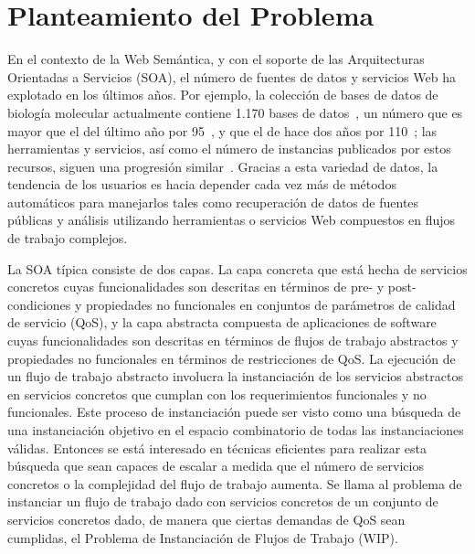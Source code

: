 \section{Planteamiento del Problema}

En el contexto de la Web Semántica, y con el soporte de las Arquitecturas Orientadas a
Servicios (SOA), el número de fuentes de datos y servicios Web ha explotado en
los últimos años. Por ejemplo, la colección de bases de datos de biología
molecular actualmente contiene 1.170 bases de datos~\cite{Galperin09}, un número
que es
mayor que el del último año por 95~\cite{Galperin2008}, y que el de hace dos
años por 110~\cite{Galperin2007};
las herramientas y servicios, así como el número de instancias
publicados por estos recursos, siguen una progresión similar~\cite{Benson07}.
Gracias a
esta variedad de datos, la tendencia de los usuarios es hacia depender cada vez
más de métodos automáticos para manejarlos tales como recuperación de datos de
fuentes públicas y análisis utilizando herramientas o servicios Web compuestos
en flujos de trabajo complejos.

La SOA típica consiste de dos capas. La capa concreta que está hecha de
servicios concretos cuyas funcionalidades son descritas en términos de pre- y
post-condiciones y propiedades no funcionales en conjuntos de parámetros de
calidad de servicio (QoS), y
la capa abstracta compuesta de aplicaciones de software cuyas funcionalidades
son descritas en términos de flujos de trabajo abstractos y propiedades no
funcionales en términos de restricciones de QoS. La ejecución de un flujo de
trabajo abstracto involucra la instanciación de los servicios abstractos en
servicios concretos que cumplan con los requerimientos funcionales y no
funcionales. Este proceso de instanciación puede ser visto como una búsqueda de
una instanciación objetivo en el espacio combinatorio de todas las
instanciaciones válidas. Entonces se está interesado en técnicas eficientes para
realizar esta búsqueda que sean capaces de escalar a medida que el número de
servicios concretos o la complejidad del flujo de trabajo aumenta. Se llama al
problema de instanciar un flujo de trabajo dado con servicios concretos de un
conjunto de servicios concretos dado, de manera que ciertas demandas de QoS sean
cumplidas, el Problema de Instanciación de Flujos de Trabajo (WIP).

